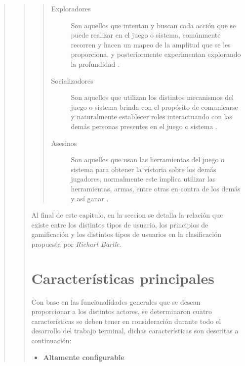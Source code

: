 \begin{quote}
\begin{quote}
\begin{quote}
\begin{description}
        \item[Exploradores]
            Son aquellos que intentan y buscan cada acción que se puede realizar en el
            juego o sistema, comúnmente recorren y hacen un mapeo de la amplitud que se
            les proporciona, y posteriormente experimentan explorando la profundidad
            \cite[p. 4]{BartleUsuarios}.

        \item[Socializadores]
            Son aquellos que utilizan los distintos mecanismos del juego o sistema brinda
            con el propósito de comunicarse y naturalmente establecer roles interactuando
            con las demás personas presentes en el juego o sistema
            \cite[p. 4]{BartleUsuarios}.

        \item[Asesinos]
            Son aquellos que usan las herramientas del juego o sistema para obtener la
            vistoria sobre los demás jugadores, normalmente este implica utilizar las
            herramientas, armas, entre otras en contra de los demás y así ganar
            \cite[p. 4]{BartleUsuarios}.

        \end{description}
        \end{quote}

    \noindent
    Al final de este capitulo, en la seccion  se detalla
    la relación que existe entre los distintos tipos de usuario, los principios de
    gamificación y los distintos tipos de usuarios en la clasificación propuesta por
    {\it Richart Bartle}.


\section{Características principales}

 Con base en las funcionalidades generales que se desean proporcionar a los distintos
 actores, se determinaron cuatro características se deben tener en consideración durante
 todo el desarrollo del trabajo terminal, dichas características son descritas a continuación:


    \begin{multicols}{2}
    \begin{itemize}
    \item{\bf\color{primary} Altamente configurable }


\end{itemize}
\end{multicols}
\end{quote}
\end{quote}
